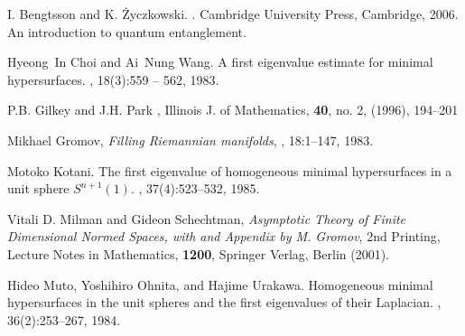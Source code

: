 \documentclass{amsart}
\theoremstyle{definition}
\theoremstyle{remark}
\begin{document}
\begin{thebibliography}{10}
  



   


\providecommand{\noopsort}[1]{}\providecommand{\singleletter}[1]{#1}%

I. Bengtsson and K. {\.Z}yczkowski.
.
\newblock Cambridge University Press, Cambridge, 2006.
\newblock An introduction to quantum entanglement.

Hyeong~In Choi and Ai~Nung Wang.
\newblock A first eigenvalue estimate for minimal hypersurfaces.
, 18(3):559 – 562, 1983.

 P.B. Gilkey and J.H. Park 
,
\newblock Illinois J. of Mathematics, \textbf{40}, no. 2, (1996), 194--201

 Mikhael Gromov,
\textit{Filling Riemannian manifolds}, 
, 18:1--147, 1983.


Motoko Kotani.
\newblock The first eigenvalue of homogeneous minimal hypersurfaces in a unit
  sphere {$S^{n+1}(1)$}.
, 37(4):523--532, 1985.

 Vitali D. Milman and Gideon Schechtman,
\textit{Asymptotic Theory of Finite Dimensional Normed Spaces, with and Appendix by M. Gromov}, 2nd Printing,
Lecture Notes in Mathematics, \textbf{1200},  Springer Verlag,
Berlin (2001).

Hideo Mut{o}, Yoshihiro Ohnita, and Hajime Urakawa.
\newblock Homogeneous minimal hypersurfaces in the unit spheres and the first
  eigenvalues of their {L}aplacian.
, 36(2):253--267, 1984.


\end{thebibliography}
\end{document}
